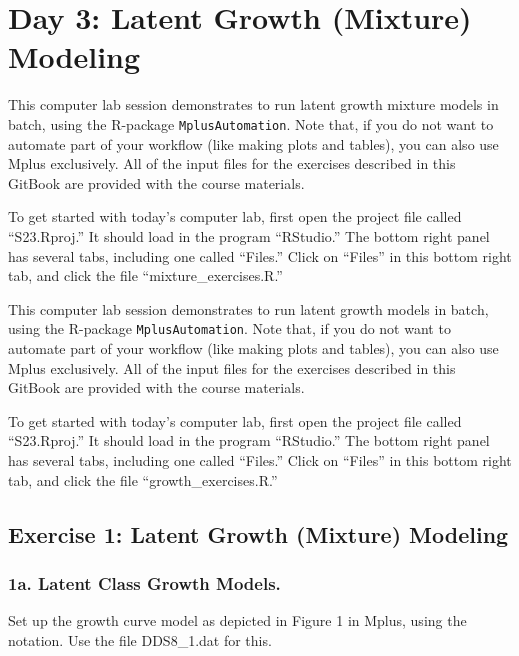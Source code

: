 \documentclass[
]{book}
\begin{document}
\hypertarget{day-3-latent-growth-mixture-modeling}{%
\chapter{Day 3: Latent Growth (Mixture) Modeling}\label{day-3-latent-growth-mixture-modeling}}

This computer lab session demonstrates to run latent growth mixture models in batch, using the R-package \texttt{MplusAutomation}.
Note that, if you do not want to automate part of your workflow (like making plots and tables), you can also use Mplus exclusively.
All of the input files for the exercises described in this GitBook are provided with the course materials.

To get started with today's computer lab, first open the project file called ``S23.Rproj.'' It should load in the program ``RStudio.'' The bottom right panel has several tabs, including one called ``Files.'' Click on ``Files'' in this bottom right tab, and click the file ``mixture\_exercises.R.''

This computer lab session demonstrates to run latent growth models in batch, using the R-package \texttt{MplusAutomation}.
Note that, if you do not want to automate part of your workflow (like making plots and tables), you can also use Mplus exclusively.
All of the input files for the exercises described in this GitBook are provided with the course materials.

To get started with today's computer lab, first open the project file called ``S23.Rproj.'' It should load in the program ``RStudio.'' The bottom right panel has several tabs, including one called ``Files.'' Click on ``Files'' in this bottom right tab, and click the file ``growth\_exercises.R.''

\hypertarget{exercise-1-latent-growth-mixture-modeling}{%
\section{Exercise 1: Latent Growth (Mixture) Modeling}\label{exercise-1-latent-growth-mixture-modeling}}

\hypertarget{a.-latent-class-growth-models.}{%
\subsection{1a. Latent Class Growth Models.}\label{a.-latent-class-growth-models.}}

Set up the growth curve model as depicted in Figure 1 in Mplus, using the \textbar{} notation. Use the file DDS8\_1.dat for this.
\end{document}
